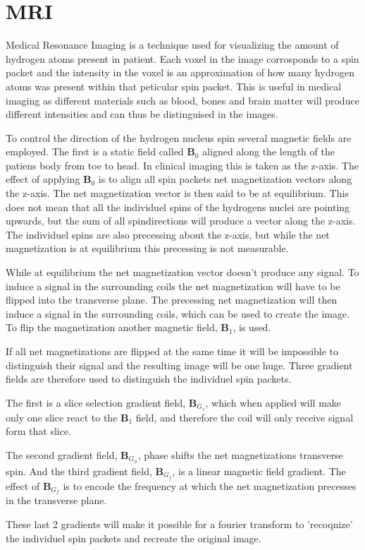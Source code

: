 \section{MRI}


Medical Resonance Imaging is a technique used for visualizing the
amount of hydrogen atoms present in patient. Each voxel in the image
corrosponds to a spin packet and the intensity in the voxel is an
approximation of how many hydrogen atoms was present within that
peticular spin packet. This is useful in medical imaging as different
materials such as blood, bones and brain matter will produce different
intensities and can thus be distinguised in the images.


To control the direction of the hydrogen nucleus spin several magnetic
fields are employed. The first is a static field called $\mathbf{B}_0$
aligned along the length of the patiens body from toe to head. In
clinical imaging this is taken as the z-axis. The effect of applying
$\mathbf{B}_0$ is to align all spin packets net magnetization vectors
along the z-axis. The net magnetization vector is then said to be at
equilibrium. This does not mean that all the individuel spins of the
hydrogens nuclei are pointing upwards, but the sum of all
spindirections will produce a vector along the z-axis. The individuel
spins are also precessing about the z-axis, but while the net
magnetization is at equilibrium this precessing is not measurable.


While at equilibrium the net magnetization vector doesn't produce any
signal. To induce a signal in the surrounding coils the net
magnetization will have to be flipped into the transverse plane. The
precessing net magnetization will then induce a signal in the
surrounding coils, which can be used to create the image. To flip the
magnetization another magnetic field, $\mathbf{B}_1$, is
used.


If all net magnetizations are flipped at the same time it will be
impossible to distinguish their signal and the resulting image will be
one huge. Three gradient fields are therefore used to distinguish the
individuel spin packets. 

The first is a slice selection gradient field, $\mathbf{B}_{G_s}$, which
when applied will make only one slice react to the $\mathbf{B}_1$
field, and therefore the coil will only receive signal form that
slice.

The second gradient field, $\mathbf{B}_{G_\phi}$, phase shifts the net
magnetizations transverse spin. And the third gradient field,
$\mathbf{B}_{G_f}$, is a linear magnetic field gradient. The effect of
$\mathbf{B}_{G_f}$ is to encode the frequency at which the net
magnetization precesses in the transverse plane.

These last 2 gradients will make it possible for a fourier transform
to 'recoqnize' the individuel spin packets and recreate the original
image.

